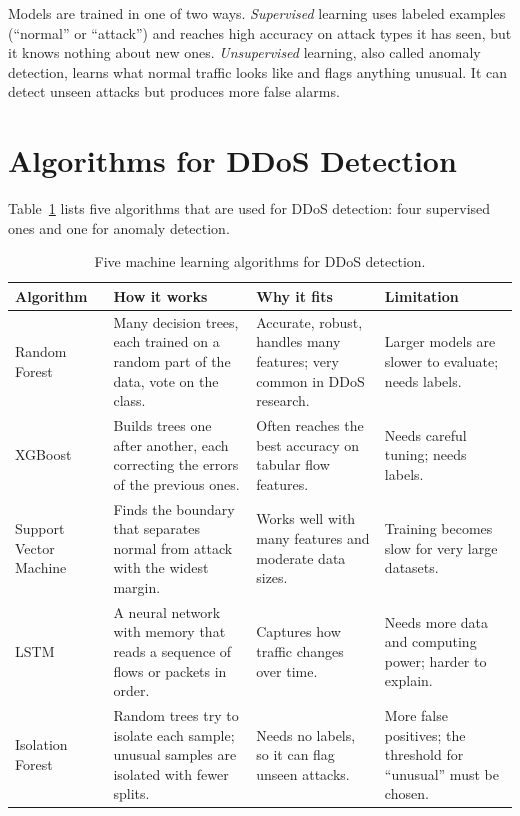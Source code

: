 Models are trained in one of two ways. \emph{Supervised} learning uses labeled examples (\enquote{normal} or \enquote{attack}) and reaches high accuracy on attack types it has seen, but it knows nothing about new ones. \emph{Unsupervised} learning, also called anomaly detection, learns what normal traffic looks like and flags anything unusual. It can detect unseen attacks but produces more false alarms.

\section{Algorithms for DDoS Detection}

Table~\ref{tab:ml} lists five algorithms that are used for DDoS detection: four supervised ones and one for anomaly detection.

\begin{table}[ht]
	\centering
	\small
	\begin{tabularx}{\textwidth}{@{}lXXX@{}}
		\toprule
		Algorithm & How it works & Why it fits & Limitation \\
		\midrule
		Random Forest~\cite{breiman} & Many decision trees, each trained on a random part of the data, vote on the class. & Accurate, robust, handles many features; very common in DDoS research. & Larger models are slower to evaluate; needs labels. \\
		XGBoost~\cite{xgboost} & Builds trees one after another, each correcting the errors of the previous ones. & Often reaches the best accuracy on tabular flow features. & Needs careful tuning; needs labels. \\
		Support Vector Machine~\cite{svm} & Finds the boundary that separates normal from attack with the widest margin. & Works well with many features and moderate data sizes. & Training becomes slow for very large datasets. \\
		LSTM~\cite{lstm} & A neural network with memory that reads a sequence of flows or packets in order. & Captures how traffic changes over time. & Needs more data and computing power; harder to explain. \\
		Isolation Forest~\cite{iforest} & Random trees try to isolate each sample; unusual samples are isolated with fewer splits. & Needs no labels, so it can flag unseen attacks. & More false positives; the threshold for \enquote{unusual} must be chosen. \\
		\bottomrule
	\end{tabularx}
	\caption{Five machine learning algorithms for DDoS detection.}
	\label{tab:ml}
\end{table}

